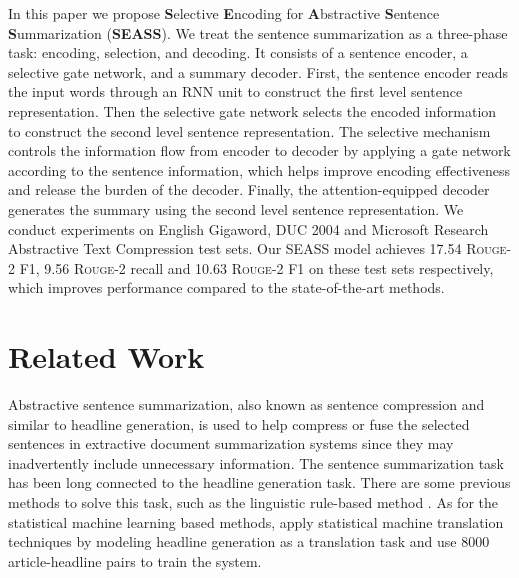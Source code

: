 \documentclass[11pt,a4paper]{article}
\newcommand{\ourModelName}{SEASS}
\begin{document}
In this paper we propose \textbf{S}elective \textbf{E}ncoding for \textbf{A}bstractive \textbf{S}entence \textbf{S}ummarization (\textbf{SEASS}).
We treat the sentence summarization as a three-phase task: encoding, selection, and decoding.
It consists of a sentence encoder, a selective gate network, and a summary decoder.
First, the sentence encoder reads the input words through an RNN unit to construct the first level sentence representation.
Then the selective gate network selects the encoded information to construct the second level sentence representation.
The selective mechanism controls the information flow from encoder to decoder by applying a gate network according to the sentence information, which helps improve encoding effectiveness and release the burden of the decoder.
Finally, the attention-equipped decoder generates the summary using the second level sentence representation.
We conduct experiments on English Gigaword, DUC 2004 and Microsoft Research Abstractive Text Compression test sets.
Our \ourModelName{} model achieves 17.54 \textsc{Rouge}-2 F1, 9.56 \textsc{Rouge}-2 recall and 10.63 \textsc{Rouge}-2 F1 on these test sets respectively, which improves performance compared to the state-of-the-art methods.

 
\section{Related Work}
\label{sec:relWork}

Abstractive sentence summarization, also known as sentence compression and similar to headline generation, is used to help compress or fuse the selected sentences in extractive document summarization systems since they may inadvertently include unnecessary information.
The sentence summarization task has been long connected to the headline generation task.
There are some previous methods to solve this task, such as the linguistic rule-based method \citep{dorr2003hedge}.
As for the statistical machine learning based methods, \citet{banko2000headline} apply statistical machine translation techniques by modeling headline generation as a translation task and use 8000 article-headline pairs to train the system.
\end{document}
